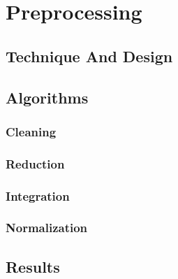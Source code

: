 
\chapter{Preprocessing} %

\label{Preprocessing} %




\section{Technique And Design}


\section{Algorithms}
\subsection{Cleaning}
\subsection{Reduction}
\subsection{Integration}
\subsection{Normalization}


\section{Results}

